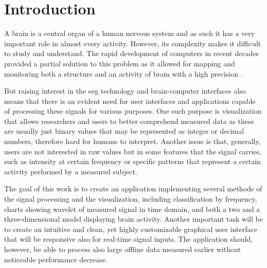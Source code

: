 

\printglossaries
\glsunsetall

\chapter{Introduction}
A brain is a central organ of a human nervous system and as such it has a very
important role in almost every activity. However, its complexity makes it
difficult to study and understand. The rapid development of computers in recent
decades provided a partial solution to this problem as it allowed for mapping and
monitoring both a structure and an activity of brain with a high precision \cite{compForBrainStudy}.

But raising interest in the \gls{eeg} technology and brain-computer interfaces also means
that there is an evident need for user interfaces and applications capable of
processing these signals for various purposes. One such purpose is visualization
that allows researchers and users to better comprehend measured data as these
are usually just binary values that may be represented as integer or decimal
numbers, therefore hard for humans to interpret. Another issue is that,
generally, users are not interested in raw values but in some features that the
signal carries, such as intensity at certain frequency or specific patterns that
represent a certain activity performed by a measured subject.

The goal of this work is to create an application implementing several
methods of the signal processing and the visualization, including classification by
frequency, charts showing wavelet of measured signal in time domain, and both
a two and a three-dimensional model displaying brain activity. Another important
task will be to create an intuitive and clean, yet highly customizable graphical
user interface that will be responsive also for real-time signal inputs. The
application should, however, be able to process also large offline data measured
earlier without noticeable performance decrease.

